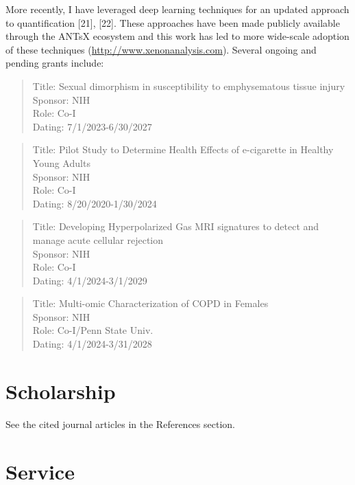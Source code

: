 \documentclass[
  11pt,
]{article}
\begin{document}
More recently, I have leveraged deep learning techniques for an updated
approach to quantification {[}21{]}, {[}22{]}. These approaches have
been made publicly available through the ANTsX ecosystem and this work
has led to more wide-scale adoption of these techniques
(\url{http://www.xenonanalysis.com}). Several ongoing and pending grants
include:

\begin{quote}
Title: Sexual dimorphism in susceptibility to emphysematous tissue
injury\\
Sponsor: NIH\\
Role: Co-I\\
Dating: 7/1/2023-6/30/2027
\end{quote}

\begin{quote}
Title: Pilot Study to Determine Health Effects of e-cigarette in Healthy
Young Adults\\
Sponsor: NIH\\
Role: Co-I\\
Dating: 8/20/2020-1/30/2024
\end{quote}

\begin{quote}
Title: Developing Hyperpolarized Gas MRI signatures to detect and manage
acute cellular rejection\\
Sponsor: NIH\\
Role: Co-I\\
Dating: 4/1/2024-3/1/2029
\end{quote}

\begin{quote}
Title: Multi-omic Characterization of COPD in Females\\
Sponsor: NIH\\
Role: Co-I/Penn State Univ.\\
Dating: 4/1/2024-3/31/2028
\end{quote}

\hypertarget{scholarship}{%
\section{Scholarship}\label{scholarship}}

See the cited journal articles in the References section.

\hypertarget{service}{%
\section{Service}\label{service}}
\end{document}
